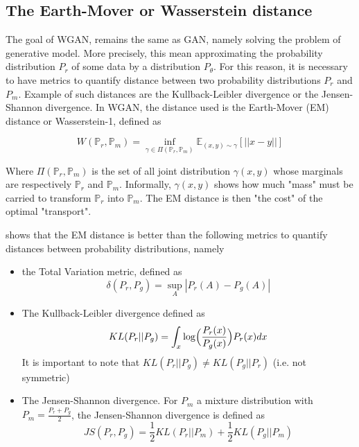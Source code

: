 \documentclass[11pt,a4paper,twoside]{report}
\begin{document}
\subsection{The Earth-Mover or Wasserstein distance}


The goal of WGAN, remains the same as GAN, namely solving the problem of generative model. More precisely, this mean approximating the probability distribution $P_r$ of some data by a distribution $P_{\theta}$. For this reason, it is necessary to have metrics to quantify distance between two probability distributions $P_r$ and $P_m$. Example of such distances are the Kullback-Leibler divergence or the Jensen-Shannon divergence. In WGAN, the distance used is the Earth-Mover (EM) distance or Wasserstein-1, defined as 

\begin{equation}
    W(\mathbb{P}_r, \mathbb{P}_m) = \inf_{\gamma \in \Pi(\mathbb{P}_r, \mathbb{P}_m)} \mathbb{E}_{(x,y) \sim \gamma} [||x-y||]
\end{equation}

Where $\Pi(\mathbb{P}_r, \mathbb{P}_m)$ is the set of all joint distribution $\gamma(x,y)$ whose marginals are respectively $\mathbb{P}_r$ and $\mathbb{P}_m$. Informally, $\gamma(x,y)$ shows how much "mass" must be carried to transform $\mathbb{P}_r$ into $\mathbb{P}_m$. The EM distance is then "the cost" of the optimal "transport".

\cite{arjovsky2017wasserstein} shows that the EM distance is better than the following metrics to quantify distances between probability distributions, namely

\begin{itemize}
    \item the Total Variation metric, defined as
    \begin{equation}
        \delta(P_r, P_g) = \sup_{A} |P_r(A) -  P_g(A)|
    \end{equation}
    \item The Kullback-Leibler divergence defined as
    \begin{equation}
        KL(P_r||P_g) = \int_x  \log \Bigl( \frac{P_r(x)}{P_g(x)} \Bigr) P_r(x) dx
    \end{equation}
    It is important to note that $KL(P_r||P_g) \neq KL(P_g||P_r)$ (i.e. not symmetric)
    \item The Jensen-Shannon divergence. For $P_m$ a mixture distribution with $P_m = \frac{P_r + P_g}{2}$, the Jensen-Shannon divergence is defined as  
    \begin{equation}
        JS(P_r, P_g) = \frac{1}{2} KL(P_r||P_m) + \frac{1}{2} KL(P_g||P_m)
    \end{equation}
\end{itemize}
\end{document}
